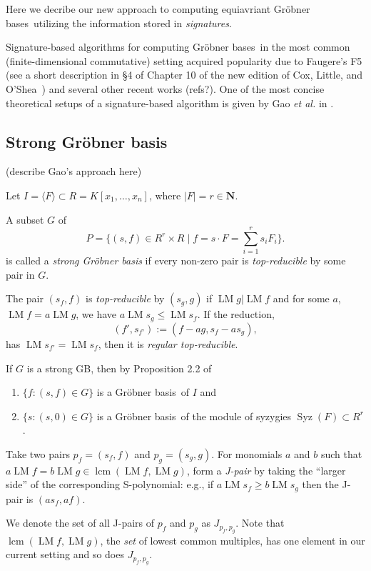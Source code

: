\documentclass{amsart}
\theoremstyle{definition}
\theoremstyle{remark}
\numberwithin{equation}{section}
\newcommand{\BF}[1]{\mathbf #1}
\newcommand{\ideal}[1]{\langle #1 \rangle}
\DeclareMathOperator{\lcm}{lcm}
\DeclareMathOperator{\Syz}{Syz}
\newcommand{\LM}{\operatorname{LM}}
\newcommand{\NN}{\BF N}
\newcommand{\GB}{{Gr\"obner basis}}
\newcommand{\GBs}{{Gr\"obner bases}}
\begin{document}
Here we decribe our new approach to computing equiavriant \GBs\ utilizing the information stored in {\em signatures}. 

Signature-based algorithms for computing \GBs\ in the most common (finite-dimensional commutative) setting acquired popularity due to Faugere's F5 (see a short description in \S 4 of Chapter 10 of the new edition of Cox, Little, and O'Shea~\cite{Cox-Little-OShea:I-V-A}) and several other recent works (refs?).      
One of the most concise theoretical setups of a signature-based algorithm is given by Gao {\em et al.} in \cite{Gao-Volny-Wang:signature-GBs}.  

\subsection{Strong \GB}
(describe Gao's approach here)

Let $I=\ideal{F} \subset R=K[x_1,\ldots,x_n]$, where $|F|=r\in\NN$.

A subset $G$ of 
\[
P = \{(s,f)\in R^r\times R \mid f=s\cdot F = \sum_{i=1}^r s_iF_i\}.
\]
is called a {\em strong Gr\"obner basis} if every non-zero pair is {\em top-reducible} by some pair in $G$.

The pair $(s_f,f)$ is {\em top-reducible} by $(s_g,g)$ if $\LM g |\LM f$ and 
for some $a$, $\LM f = a \LM g$, we have $a\LM s_g\leq \LM s_f$.  If the reduction,
\[
(f',s_{f'}) := (f-ag,s_f-as_g),
\]
has $\LM s_{f'} = \LM s_f$, then it is {\em regular top-reducible}.

If $G$ is a strong GB, then by Proposition 2.2 of~\cite{Gao-Volny-Wang:signature-GBs}
\begin{enumerate}
   \item $\{f:(s,f)\in G\}$ is a \GB\ of $I$ and 
   \item $\{s:(s,0)\in G\}$ is a \GB\ of the module of syzygies $\Syz(F) \subset R^r$.
\end{enumerate}
   
Take two pairs $p_f=(s_f,f)$ and $p_g=(s_g,g)$. For monomials $a$ and $b$ such that $a\LM f = b\LM g \in \lcm(\LM f,\LM g)$, form a {\em J-pair} by taking the ``larger side'' of the corresponding S-polynomial: e.g., if $a\LM s_f \geq b\LM s_g$ then the J-pair is $(as_f,af)$.

We denote the set of all J-pairs of $p_f$ and $p_g$ as $J_{p_f,p_g}$. Note that $\lcm(\LM f,\LM g)$, the {\em set} of lowest common multiples, has one element in our current setting and so does $J_{p_f,p_g}$.  
\end{document}
